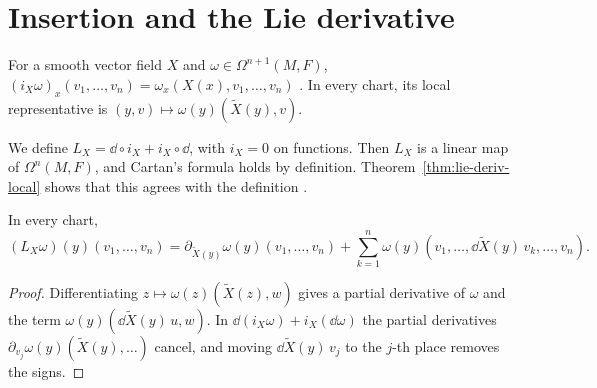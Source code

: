 \section{Insertion and the Lie derivative}
\label{sec:lie-derivative}

\begin{definition}[Insertion]
  \label{def:interior}
  \leanok
  For a smooth vector field $X$ and $\omega \in \Omega^{n+1}(M, F)$,
  $(i_X\omega)_x(v_1, \dots, v_n) = \omega_x(X(x), v_1, \dots, v_n)$
  \cite[Definition~3.6.15]{GN26}. In every chart, its local representative is
  $(y, v) \mapsto \omega(y)(\tilde X(y), v)$.
\end{definition}

\begin{definition}
  \label{def:lie-deriv}
  \leanok
  We define $L_X = \dd \circ i_X + i_X \circ \dd$, with $i_X = 0$ on functions. Then $L_X$ is a
  linear map of $\Omega^n(M, F)$, and Cartan's formula \cite[Proposition~3.6.16(c)]{GN26} holds
  by definition. Theorem~\ref{thm:lie-deriv-local} shows that this agrees with the definition
  \cite[Definition~3.6.14]{GN26}.
\end{definition}

\begin{theorem}
  \label{thm:lie-deriv-local}
  \leanok
  In every chart,
  \[
    (L_X\omega)(y)(v_1, \dots, v_n) = \partial_{\tilde X(y)}\omega(y)(v_1, \dots, v_n)
      + \sum_{k=1}^n \omega(y)(v_1, \dots, \dd\tilde X(y)\,v_k, \dots, v_n).
  \]
\end{theorem}

\begin{proof}
  \leanok
  Differentiating $z \mapsto \omega(z)(\tilde X(z), w)$ gives a partial derivative of $\omega$ and
  the term $\omega(y)(\dd\tilde X(y)\,u, w)$. In $\dd(i_X\omega) + i_X(\dd\omega)$ the partial
  derivatives $\partial_{v_j}\omega(y)(\tilde X(y), \dots)$ cancel, and moving
  $\dd\tilde X(y)\,v_j$ to the $j$-th place removes the signs.
\end{proof}

